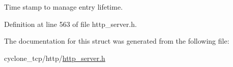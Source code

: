 Time stamp to manage entry lifetime. 



Definition at line 563 of file http\+\_\+server.\+h.



The documentation for this struct was generated from the following file\+:\begin{DoxyCompactItemize}
\item 
cyclone\+\_\+tcp/http/\hyperlink{http__server_8h}{http\+\_\+server.\+h}\end{DoxyCompactItemize}
